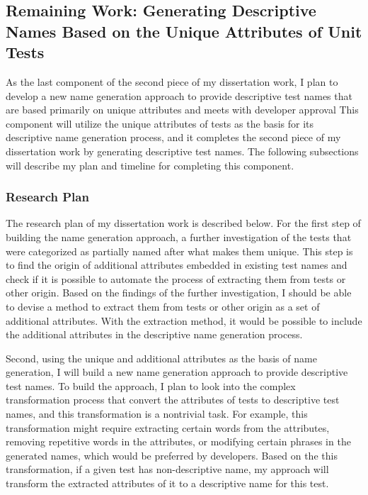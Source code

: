 \subsection{Remaining Work: Generating Descriptive Names Based on the Unique Attributes of Unit Tests}
\label{sec:remaining-work}


As the last component of the second piece of my dissertation work, I plan to develop a new name generation approach to provide descriptive test names that are based primarily on unique attributes and meets with developer approval
This component will utilize the unique attributes of tests as the basis for its descriptive name generation process, and it completes the second piece of my dissertation work by generating descriptive test names.
%
The following subsections will describe my plan and timeline for completing this component.



\subsubsection{Research Plan}


The research plan of my dissertation work is described below.
%
For the first step of building the name generation approach, a further investigation of the tests that were categorized as partially named after what makes them unique.
%
This step is to find the origin of additional attributes embedded in existing test names and check if it is possible to automate the process of extracting them from tests or other origin.
%
Based on the findings of the further investigation, I should be able to devise a method to extract them from tests or other origin as a set of additional attributes.
%
With the extraction method, it would be possible to include the additional attributes in the descriptive name generation process.


Second, using the unique and additional attributes as the basis of name generation, I will build a new name generation approach to provide descriptive test names.
%
To build the approach, I plan to look into the complex transformation process that convert the attributes of tests to descriptive test names, and this transformation is a nontrivial task.
%
For example, this transformation might require extracting certain words from the attributes, removing repetitive words in the attributes, or modifying certain phrases in the generated names, which would be preferred by developers.
%
Based on the this transformation, if a given test has non-descriptive name, my approach will transform the extracted attributes of it to a descriptive name for this test.



